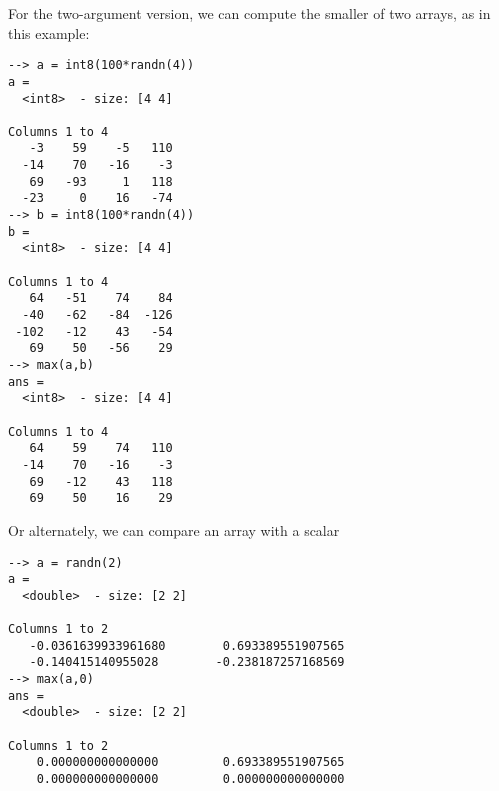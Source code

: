 For the two-argument version, we can compute the smaller of two arrays,
as in this example:
\begin{verbatim}
--> a = int8(100*randn(4))
a =
  <int8>  - size: [4 4]

Columns 1 to 4
   -3    59    -5   110
  -14    70   -16    -3
   69   -93     1   118
  -23     0    16   -74
--> b = int8(100*randn(4))
b =
  <int8>  - size: [4 4]

Columns 1 to 4
   64   -51    74    84
  -40   -62   -84  -126
 -102   -12    43   -54
   69    50   -56    29
--> max(a,b)
ans = 
  <int8>  - size: [4 4]
 
Columns 1 to 4
   64    59    74   110  
  -14    70   -16    -3  
   69   -12    43   118  
   69    50    16    29  
\end{verbatim}
Or alternately, we can compare an array with a scalar
\begin{verbatim}
--> a = randn(2)
a = 
  <double>  - size: [2 2]
 
Columns 1 to 2
   -0.0361639933961680        0.693389551907565      
   -0.140415140955028        -0.238187257168569      
--> max(a,0)
ans = 
  <double>  - size: [2 2]
 
Columns 1 to 2
    0.000000000000000         0.693389551907565      
    0.000000000000000         0.000000000000000      
\end{verbatim}
